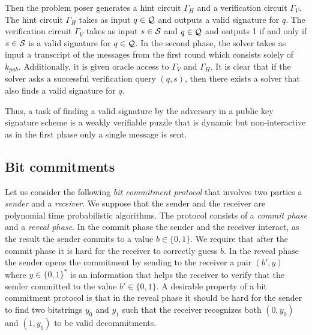 Then the problem poser generates a hint circuit $\Gamma_H$ and a verification circuit $\Gamma_V$.
The hint circuit $\Gamma_H$ takes as input $q \in \mathcal{Q}$ and outputs a valid signature for $q$. The verification circuit
$\Gamma_V$ takes as input $s \in \mathcal{S}$ and $q \in \mathcal{Q}$ and outputs 1 if and only if $s \in \mathcal{S}$ is a valid signature for $q \in \mathcal{Q}$.
In the second phase, the solver takes as input a transcript of the messages from the first round which consists solely of $k_{pub}$.
Additionally, it is given oracle access to $\Gamma_V$ and $\Gamma_H$.
It is clear that if the solver asks a successful verification query $(q,s)$, then there exists a solver that also finds a valid signature for $q$.

Thus, a task of finding a valid signature by the adversary in a public key signature scheme is a weakly verifiable puzzle that
is dynamic but non-interactive as in the first phase only a single message is sent.
%
\subsection{Bit commitments}
Let us consider the following \textit{bit commitment protocol} that involves two parties a \textit{sender} and a \textit{receiver}.
We suppose that the sender and the receiver are polynomial time probabilistic algorithms.
The protocol consists of a \textit{commit phase} and a \textit{reveal phase}.
In the commit phase the sender and the receiver interact, as the result the sender commits to a value $b \in \{0,1\}$.
We require that after the commit phase it is hard for the receiver to correctly guess $b$.
In the reveal phase the sender opens the commitment by sending to the receiver a pair $(b', y)$ where $y \in \{0,1\}^{*}$ is an information
that helps the receiver to verify that the sender committed to the value $b' \in \{0,1\}$.
A desirable property of a bit commitment protocol is that in the reveal phase it
should be hard for the sender to find two bitstrings $y_0$ and $y_1$ such that
the receiver recognizes both $(0,y_0)$ and $(1, y_1)$ to be valid decommitments.

